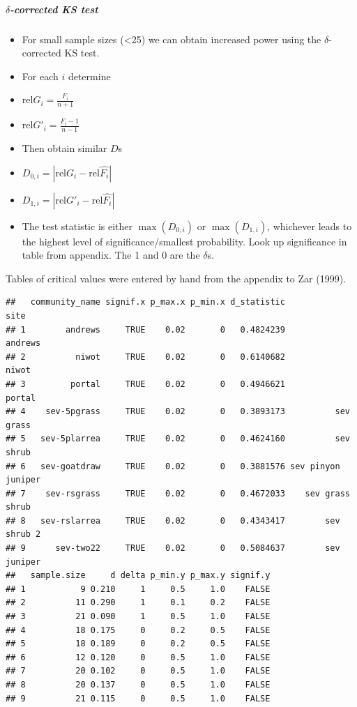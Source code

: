 \documentclass[]{article}
\providecommand{\tightlist}{%
  \setlength{\itemsep}{0pt}\setlength{\parskip}{0pt}}
\let\oldsubparagraph\subparagraph
\renewcommand{\subparagraph}[1]{\oldsubparagraph{#1}\mbox{}}
\begin{document}
\subparagraph{\texorpdfstring{\(\delta\)-corrected KS
test}{\textbackslash{}delta-corrected KS test}}\label{delta-corrected-ks-test}

\begin{itemize}
\tightlist
\item
  For small sample sizes (\textless{}25) we can obtain increased power
  using the \(\delta\)-corrected KS test.
\item
  For each \(i\) determine
\item
  \(\textrm{rel}G_i = \frac{F_i}{n + 1}\)
\item
  \(\textrm{rel}G'_i = \frac{F_i - 1}{n - 1}\)
\item
  Then obtain similar \(D\)s
\item
  \(D_{0, i} = |\textrm{rel}G_i - \textrm{rel}\hat{F_i}|\)
\item
  \(D_{1, i} = |\textrm{rel}G'_i - \textrm{rel}\hat{F_i}|\)
\item
  The test statistic is either \(\max(D_{0, i})\) or \(\max(D_{1, i})\),
  whichever leads to the highest level of significance/smallest
  probability. Look up significance in table from appendix. The 1 and 0
  are the \(\delta\)s.
\end{itemize}

Tables of critical values were entered by hand from the appendix to Zar
(1999).

\begin{verbatim}
##   community_name signif.x p_max.x p_min.x d_statistic               site
## 1        andrews     TRUE    0.02       0   0.4824239            andrews
## 2          niwot     TRUE    0.02       0   0.6140682              niwot
## 3         portal     TRUE    0.02       0   0.4946621             portal
## 4    sev-5pgrass     TRUE    0.02       0   0.3893173          sev grass
## 5   sev-5plarrea     TRUE    0.02       0   0.4624160          sev shrub
## 6   sev-goatdraw     TRUE    0.02       0   0.3881576 sev pinyon juniper
## 7    sev-rsgrass     TRUE    0.02       0   0.4672033    sev grass shrub
## 8   sev-rslarrea     TRUE    0.02       0   0.4343417        sev shrub 2
## 9      sev-two22     TRUE    0.02       0   0.5084637        sev juniper
##   sample.size     d delta p_min.y p_max.y signif.y
## 1           9 0.210     1     0.5     1.0    FALSE
## 2          11 0.290     1     0.1     0.2    FALSE
## 3          21 0.090     1     0.5     1.0    FALSE
## 4          18 0.175     0     0.2     0.5    FALSE
## 5          18 0.189     0     0.2     0.5    FALSE
## 6          12 0.120     0     0.5     1.0    FALSE
## 7          20 0.102     0     0.5     1.0    FALSE
## 8          20 0.137     0     0.5     1.0    FALSE
## 9          21 0.115     0     0.5     1.0    FALSE
\end{verbatim}
\end{document}
